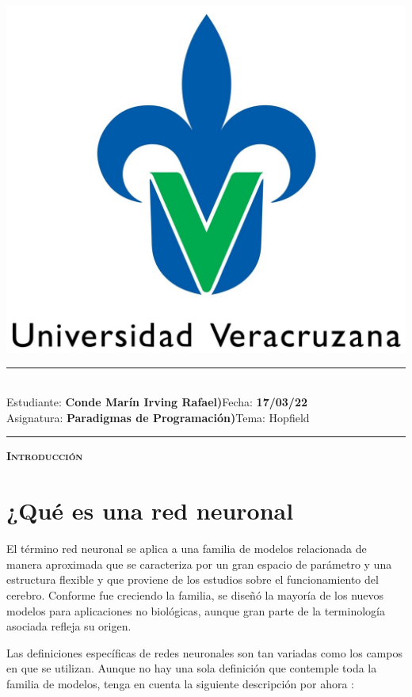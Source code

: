 \documentclass[letterpaper,12pt]{article}
\newcommand{\student}{\textbf{Conde Marín Irving Rafael)}}
\newcommand{\course}{\textbf{Paradigmas de Programación)}}
\newcommand{\fecha}{\textbf{17/03/22}}
\begin{document}
\thispagestyle{empty}
\begin{center}
	\includegraphics[scale = 0.1]{Imagenes/R.jpg}
\end{center}
\noindent
\rule{17cm}{0.2cm}\\[0.3cm]
Estudiante: \student \hfill Fecha: \fecha\\[0.1cm]
Asignatura: \course \hfill Tema: Hopfield\\
\rule{17cm}{0.05cm}
\vspace{0.1cm}


{\scshape\LARGE \textbf{Introducción} \par}

\section{¿Qué es una red neuronal}

    El término red neuronal se aplica a una familia de modelos relacionada de manera aproximada que se caracteriza por un gran espacio de parámetro y una estructura flexible y que proviene de los estudios sobre el funcionamiento del cerebro. Conforme fue creciendo la familia, se diseñó la mayoría de los nuevos modelos para aplicaciones no biológicas, aunque gran parte de la terminología asociada refleja su origen.

    Las definiciones específicas de redes neuronales son tan variadas como los campos en que se utilizan. Aunque no hay una sola definición que contemple toda la familia de modelos, tenga en cuenta la siguiente descripción por ahora :
\end{document}
